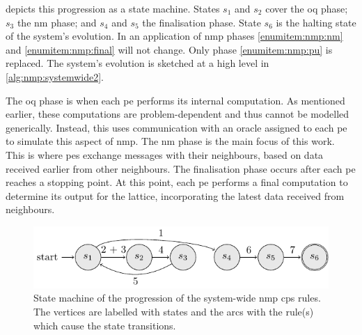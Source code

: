  depicts this progression as a state machine.  States \(s_1\) and \(s_2\) cover the \gls{oq} phase; \(s_3\) the \gls{nm} phase; and \(s_4\) and \(s_5\) the \textsf{finalisation} phase.  State \(s_6\) is the halting state of the system's evolution.  In an application of \gls{nmp} phases \ref{enumitem:nmp:nm} and \ref{enumitem:nmp:final} will not change.  Only phase \ref{enumitem:nmp:pu} is replaced.  The system's evolution is sketched at a high level in \cref{alg:nmp:systemwide2}.

The \gls{oq} phase is when each \gls{pe} performs its internal computation. As mentioned earlier, these computations are problem-dependent and thus cannot be modelled generically. Instead, this  uses communication with an oracle assigned to each \gls{pe} to simulate this aspect of \gls{nmp}. The \gls{nm} phase is the main focus of this work. This is where \glspl{pe} exchange messages with their neighbours, based on data received earlier from other neighbours. The \textsf{finalisation} phase occurs after each \gls{pe} reaches a stopping point. At this point, each \gls{pe} performs a final computation to determine its output for the lattice, incorporating the latest data received from neighbours.

\begin{figure}
    \centering
    \includegraphics{chapters/nmp/images/systemwidestatemachine.pdf}
    \caption[State machine of the progression of the system-wide  \gls{cps} rules.]{State machine of the progression of the system-wide \gls{nmp} \gls{cps} rules.  The vertices are labelled with states and the arcs with the rule(s) which cause the state transitions.}
    \label{fig:nmp:systemwidestatemachine}
\end{figure}

